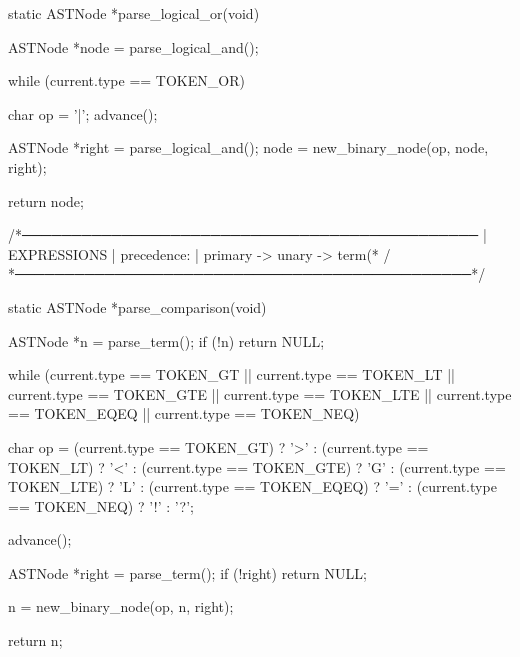 \documentclass{article}
\begin{document}
static ASTNode *parse_logical_or(void)
{
    ASTNode *node = parse_logical_and();

    while (current.type == TOKEN_OR)
    {
        char op = '|';
        advance();

        ASTNode *right = parse_logical_and();
        node = new_binary_node(op, node, right);
    }

    return node;
}

/*──────────────────────────────────────────────
 | EXPRESSIONS
 | precedence:
 |   primary -> unary -> term(* / %
 *──────────────────────────────────────────────*/

static ASTNode *parse_comparison(void)
{
    ASTNode *n = parse_term();
    if (!n) return NULL;

    while (current.type == TOKEN_GT  ||
           current.type == TOKEN_LT  ||
           current.type == TOKEN_GTE ||
           current.type == TOKEN_LTE ||
           current.type == TOKEN_EQEQ ||
           current.type == TOKEN_NEQ)
    {
        char op =
            (current.type == TOKEN_GT)    ? '>' :
            (current.type == TOKEN_LT)    ? '<' :
            (current.type == TOKEN_GTE)   ? 'G' :
            (current.type == TOKEN_LTE)   ? 'L' :
            (current.type == TOKEN_EQEQ)  ? '=' :
            (current.type == TOKEN_NEQ)   ? '!' :
            '?';

        advance();

        ASTNode *right = parse_term();
        if (!right) return NULL;

        n = new_binary_node(op, n, right);
    }

    return n;
}
\end{document}
